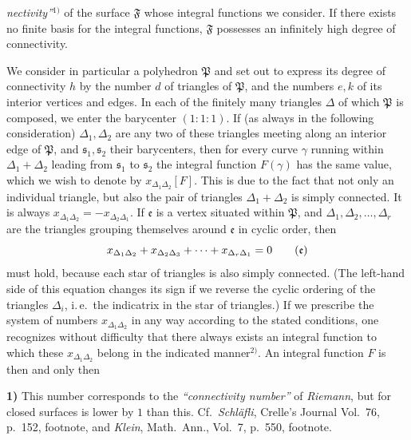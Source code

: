 \documentclass{article}
\begin{document}
\emph{nectivity''}${}^{1)}$ of the surface $\mathfrak{F}$ whose integral functions we consider. If there exists no finite basis for the integral functions, $\mathfrak{F}$ possesses an infinitely high degree of connectivity.

We consider in particular a polyhedron $\mathfrak{P}$ and set out to express its degree of connectivity $h$ by the number $d$ of triangles of $\mathfrak{P}$, and the numbers $e, k$ of its interior vertices and edges. In each of the finitely many triangles $\Delta$ of which $\mathfrak{P}$ is composed, we enter the barycenter $(1 : 1 : 1)$. If (as always in the following consideration) $\Delta_1, \Delta_2$ are any two of these triangles meeting along an interior edge of $\mathfrak{P}$, and $\mathfrak{s}_1, \mathfrak{s}_2$ their barycenters, then for every curve $\gamma$ running within $\Delta_1 + \Delta_2$ leading from $\mathfrak{s}_1$ to $\mathfrak{s}_2$ the integral function $F(\gamma)$ has the same value, which we wish to denote by $x_{\Delta_1 \Delta_2} [F]$. This is due to the fact that not only an individual triangle, but also the pair of triangles $\Delta_1 + \Delta_2$ is simply connected. It is always $x_{\Delta_1 \Delta_2} = - x_{\Delta_2 \Delta_1}$. If $\mathfrak{e}$ is a vertex situated within $\mathfrak{P}$, and $\Delta_1, \Delta_2, \dots, \Delta_r$ are the triangles grouping themselves around $\mathfrak{e}$ in cyclic order, then
\[ x_{\Delta_1 \Delta_2} + x_{\Delta_2 \Delta_3} + \dots + x_{\Delta_r \Delta_1} = 0 \tag{$\mathfrak{e}$} \]
must hold, because each star of triangles is also simply connected. (The left-hand side of this equation changes its sign if we reverse the cyclic ordering of the triangles $\Delta_i$, i.\,e.\ the indicatrix in the star of triangles.) If we prescribe the system of numbers $x_{\Delta_1 \Delta_2}$ in any way according to the stated conditions, one recognizes without difficulty that there always exists an integral function to which these $x_{\Delta_1 \Delta_2}$ belong in the indicated manner${}^{2)}$. An integral function $F$ is then and only then

\textbf{1)} This number corresponds to the \emph{``connectivity number''} of \emph{Riemann}, but for closed surfaces is lower by $1$ than this. Cf.\ \emph{Schläfli}, Crelle's Journal Vol.\ 76, p.\ 152, footnote, and \emph{Klein}, Math.\ Ann., Vol.\ 7, p.\ 550, footnote.
\end{document}
